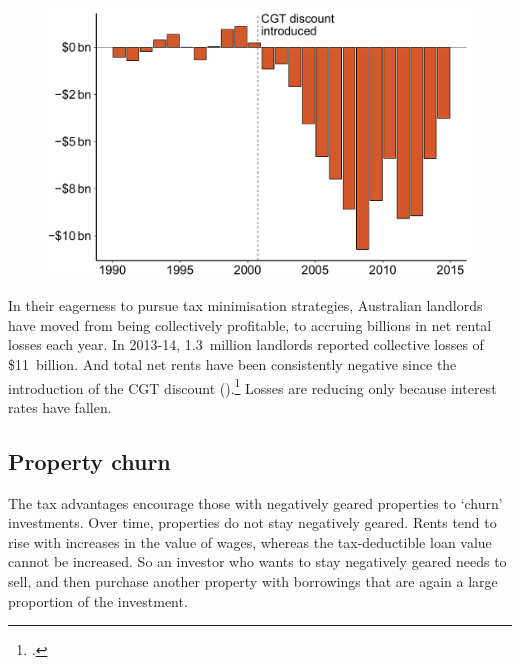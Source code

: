 \begin{figure}

\includegraphics[width=\columnwidth]{CGT-NG-atlas//Net-rent-time-series-1}

\end{figure}

In their eagerness to pursue tax minimisation strategies, Australian landlords have moved from being collectively profitable, to accruing billions in net rental losses each year.
In 2013-14, 1.3~million landlords reported collective losses of \$11~billion. 
And total net rents have been consistently negative since the introduction of the CGT discount ().\footcites{Eslake2013}{ATOTaxstats201314}  
Losses are reducing only because interest rates have fallen.

\subsection{Property churn}
The tax advantages encourage those with negatively geared properties to ‘churn’ investments. Over time, properties do not stay negatively geared. Rents tend to rise with increases in the value of wages, whereas the tax-deductible loan value cannot be increased.  So an investor who wants to stay negatively geared needs to sell, and then purchase another property with borrowings that are again a large proportion of the investment.

